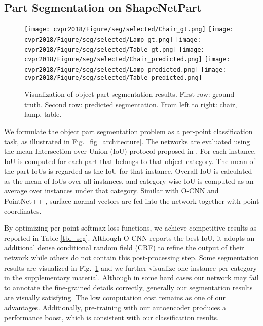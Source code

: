 \documentclass[10pt,twocolumn,letterpaper]{article}
\begin{document}
\subsection{Part Segmentation on ShapeNetPart} \label{sec_exp_seg}
%
%
\begin{figure}[h] 
        \centering
        \texttt{[image: cvpr2018/Figure/seg/selected/Chair\_gt.png]}
        \texttt{[image: cvpr2018/Figure/seg/selected/Lamp\_gt.png]}
        \texttt{[image: cvpr2018/Figure/seg/selected/Table\_gt.png]}
        \texttt{[image: cvpr2018/Figure/seg/selected/Chair\_predicted.png]}
        \texttt{[image: cvpr2018/Figure/seg/selected/Lamp\_predicted.png]}
        \texttt{[image: cvpr2018/Figure/seg/selected/Table\_predicted.png]}
        \caption{Visualization of object part segmentation results. First row: ground truth. Second row: predicted segmentation. From left to right: chair, lamp, table. }
        \label{fig_seg_selected}
        \vspace{-4pt}
\end{figure}
%
We formulate the object part segmentation problem as a per-point classification task, as illustrated in Fig.~\ref{fig_architecture}. The networks are evaluated using the mean Intersection over Union (IoU) protocol proposed in \cite{qi2016pointnet}. For each instance, IoU is computed for each part that belongs to that object category. The mean of the part IoUs is regarded as the IoU for that instance. Overall IoU is calculated as the mean of IoUs over all instances, and category-wise IoU is computed as an average over instances under that category. Similar with O-CNN \cite{wang2017cnn} and PointNet++ \cite{qi2017pointnet++}, surface normal vectors are fed into the network together with point coordinates.

By optimizing per-point softmax loss functions, we achieve competitive results as reported in Table \ref{tbl_seg}. Although O-CNN reports the best IoU, it adopts an additional dense conditional random field (CRF) to refine the output of their network while others do not contain this post-processing step. Some segmentation results are visualized in Fig.~\ref{fig_seg_selected} and we further visualize one instance per category in the supplementary material. Although in some hard cases our network may fail to annotate the fine-grained details correctly, generally our segmentation results are visually satisfying. The low computation cost remains as one of our advantages. Additionally, pre-training with our autoencoder produces a performance boost, which is consistent with our classification results.
\end{document}
